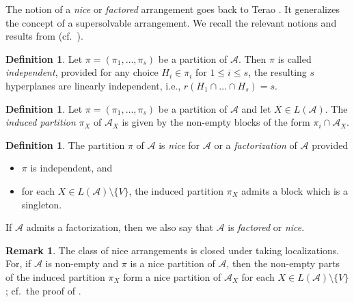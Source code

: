 \documentclass[12pt]{amsart}
\newcommand\CA{{\mathscr A}}
\numberwithin{equation}{section}
\theoremstyle{plain}
\theoremstyle{definition}
\newtheorem{defn}[equation]{Definition}
\newtheorem{remark}[equation]{Remark}
\begin{document}
The notion of a \emph{nice} or \emph{factored}
arrangement goes back to Terao \cite{terao:factored}.
It generalizes the concept of a supersolvable arrangement.
We recall the relevant notions and results from \cite{terao:factored}
(cf.\  \cite[\S 2.3]{orlikterao:arrangements}).

\begin{defn}
	\label{def:independent}
	Let $\pi = (\pi_1, \ldots , \pi_s)$ be a partition of $\CA$.
	Then $\pi$ is called \emph{independent}, provided
	for any choice $H_i \in \pi_i$ for $1 \le i \le s$,
	the resulting $s$ hyperplanes are linearly independent, i.e.,
	$r(H_1 \cap \ldots \cap H_s) = s$.
\end{defn}

\begin{defn}
	\label{def:indpart}
	Let $\pi = (\pi_1, \ldots , \pi_s)$ be a partition of $\CA$
	and let $X \in L(\CA)$.
	The \emph{induced partition} $\pi_X$ of $\CA_X$ is given by the non-empty
	blocks of the form $\pi_i \cap \CA_X$.
\end{defn}


\begin{defn}
	\label{def:factored}
	The partition
	$\pi$ of $\CA$ is
	\emph{nice} for $\CA$ or a \emph{factorization} of $\CA$  provided
	\begin{itemize}
		\item[(i)] $\pi$ is independent, and
		\item[(ii)] for each $X \in L(\CA) \setminus \{V\}$, the induced partition $\pi_X$ admits a block
		which is a singleton.
	\end{itemize}
	If $\CA$ admits a factorization, then we also say that $\CA$ is \emph{factored} or \emph{nice}.
\end{defn}

\begin{remark}
	\label{rem:factored}
	The class of nice arrangements is closed under taking localizations.
	For, if $\CA$ is non-empty and
	$\pi$ is a nice partition of $\CA$, then the non-empty parts of the
	induced partition $\pi_X$ form a nice partition of $\CA_X$
	for each $X \in L(\CA)\setminus\{V\}$;
	cf.~the proof of \cite[Cor.~2.11]{terao:factored}.
\end{remark}
\end{document}
